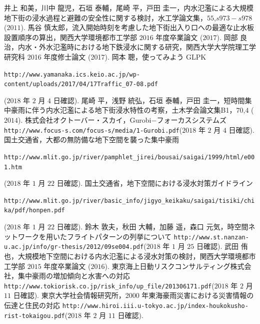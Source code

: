\documentclass[a4paper,12pt,fleqn]{jarticle}
\begin{document}
\newpage
\begin{thebibliography}{99}
井上 和美，川中 龍児，石垣 泰輔，尾崎 平，戸田 圭一，内水氾濫による大規模地下街の浸水過程と避難の安全性に関する検討，水工学論文集，$55$,$s973-s978$ ($2011$).
馬谷 慎太郎，流入開始時刻を考慮した地下街出入り口への最適な止水板設置順序の算出，関西大学環境都市工学部 $2016$ 年度卒業論文 ($2017$).
岡部 良治，内水・外水氾濫時における地下鉄浸水に関する研究，関西大学大学院理工学研究科 2016 年度修士論文 (2017).
岡本 聰，使ってみよう GLPK\par \footnotesize \verb|http://www.yamanaka.ics.keio.ac.jp/wp-content/uploads/2017/04/17Traffic_07-08.pdf|\par($2018$ 年 $2$ 月 $4$ 日確認).
尾崎 平，浅野 統弘，石垣 泰輔，戸田 圭一，短時間集中豪雨に伴う内水氾濫による地下街浸水特性の考察，土木学会論文集B1，$70$,$4$ ($2014$).
株式会社オクトーバー・スカイ，Gurobi$-$フォーカスシステムズ \verb|http://www.focus-s.com/focus-s/media/1-Gurobi.pdf|($2018$ 年 $2$ 月 $4$ 日確認).
国土交通省，大都の無防備な地下空間を襲った集中豪雨\par \footnotesize \verb|http://www.mlit.go.jp/river/pamphlet_jirei/bousai/saigai/1999/html/e001.htm|\par($2018$ 年 $1$ 月 $22$ 日確認).
国土交通省，地下空間における浸水対策ガイドライン\par \verb|http://www.mlit.go.jp/river/basic_info/jigyo_keikaku/saigai/tisiki/chika/pdf/honpen.pdf|\par($2018$ 年 $1$ 月 $22$ 日確認).
鈴木 敦夫，秋田 大輔，加藤 遥，森口 元気，時空間ネットワークを用いたフライトパターンの列挙について \verb|http://www.st.nanzan-u.ac.jp/info/gr-thesis/2012/09se004.pdf|($2018$ 年 $1$ 月 $25$ 日確認).
武田 侑也，大規模地下空間における内水氾濫による浸水対策の検討，関西大学環境都市工学部 $2015$ 年度卒業論文 ($2016$).
東京海上日動リスクコンサルティング株式会社，集中豪雨の増加傾向と水害への対応 \verb|http://www.tokiorisk.co.jp/risk_info/up_file/201306171.pdf|($2018$ 年 $2$ 月 $11$ 日確認).
東京大学社会情報研究所，2000 年東海豪雨災害における災害情報の伝達と住民の対応 \verb|http://www.hiroi.iii.u-tokyo.ac.jp/index-houkokusho-rist-tokaigou.pdf|($2018$ 年 $2$ 月 $11$ 日確認).

\end{thebibliography}
\end{document}
